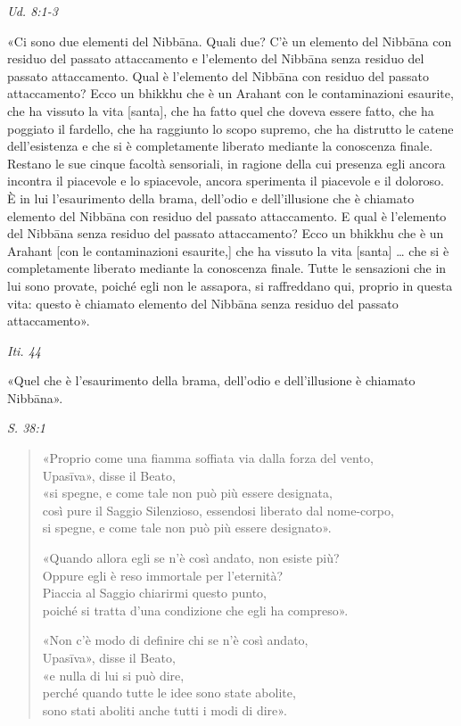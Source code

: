 \emph{Ud. 8:1-3}


«Ci sono due elementi del Nibbāna. Quali due? C’è un elemento del
Nibbāna con residuo del passato attaccamento e l’elemento del Nibbāna
senza residuo del passato attaccamento. Qual è l’elemento del Nibbāna
con residuo del passato attaccamento? Ecco un bhikkhu che è un Arahant
con le contaminazioni esaurite, che ha vissuto la vita [santa], che ha
fatto quel che doveva essere fatto, che ha poggiato il fardello, che ha
raggiunto lo scopo supremo, che ha distrutto le catene dell’esistenza e
che si è completamente liberato mediante la conoscenza finale. Restano
le sue cinque facoltà sensoriali, in ragione della cui presenza egli
ancora incontra il piacevole e lo spiacevole, ancora sperimenta il
piacevole e il doloroso. È in lui l’esaurimento della brama, dell’odio e
dell’illusione che è chiamato elemento del Nibbāna con residuo del
passato attaccamento. E qual è l’elemento del Nibbāna senza residuo del
passato attaccamento? Ecco un bhikkhu che è un Arahant [con le
contaminazioni esaurite,] che ha vissuto la vita [santa] …​ che si è
completamente liberato mediante la conoscenza finale. Tutte le
sensazioni che in lui sono provate, poiché egli non le assapora, si
raffreddano qui, proprio in questa vita: questo è chiamato elemento del
Nibbāna senza residuo del passato attaccamento».


\emph{Iti. 44}


«Quel che è l’esaurimento della brama, dell’odio e dell’illusione è
chiamato Nibbāna».


\emph{S. 38:1}


\begin{quotation}
«Proprio come una fiamma soffiata via dalla forza del vento, \\
Upasīva», disse il Beato, \\
«si spegne, e come tale non può più essere designata, \\
così pure il Saggio Silenzioso, essendosi liberato dal nome-corpo, \\
si spegne, e come tale non può più essere designato».


«Quando allora egli se n’è così andato, non esiste più? \\
Oppure egli è reso immortale per l’eternità? \\
Piaccia al Saggio chiarirmi questo punto, \\
poiché si tratta d’una condizione che egli ha compreso».


«Non c’è modo di definire chi se n’è così andato, \\
Upasīva», disse il Beato, \\
«e nulla di lui si può dire, \\
perché quando tutte le idee sono state abolite, \\
sono stati aboliti anche tutti i modi di dire».
\end{quotation}

